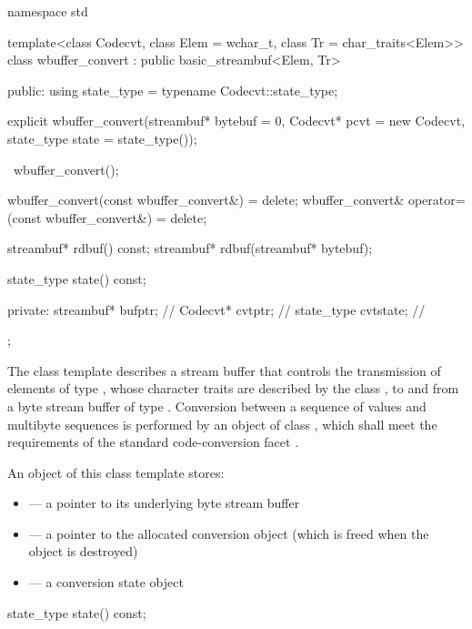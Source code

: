 %
\begin{codeblock}
namespace std {
template<class Codecvt,
    class Elem = wchar_t,
    class Tr = char_traits<Elem>>
  class wbuffer_convert
    : public basic_streambuf<Elem, Tr> {
  public:
    using state_type = typename Codecvt::state_type;

    explicit wbuffer_convert(streambuf* bytebuf = 0,
                             Codecvt* pcvt = new Codecvt,
                             state_type state = state_type());

    ~wbuffer_convert();

    wbuffer_convert(const wbuffer_convert&) = delete;
    wbuffer_convert& operator=(const wbuffer_convert&) = delete;

    streambuf* rdbuf() const;
    streambuf* rdbuf(streambuf* bytebuf);

    state_type state() const;

  private:
    streambuf* bufptr;         // \expos
    Codecvt* cvtptr;                // \expos
    state_type cvtstate;            // \expos
  };
}
\end{codeblock}

\pnum
The class template describes a stream buffer that controls the
transmission of elements of type , whose character traits are
described by the class , to and from a byte stream buffer of type
. Conversion between a sequence of  values and
multibyte sequences is performed by an object of class
, which shall meet the requirements
of the standard code-conversion facet .

\pnum
An object of this class template stores:

\begin{itemize}
\item {} --- a pointer to its underlying byte stream buffer
\item {} --- a pointer to the allocated conversion object
(which is freed when the  object is destroyed)
\item {} --- a conversion state object
\end{itemize}

%
\begin{itemdecl}
state_type state() const;
\end{itemdecl}

